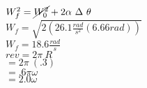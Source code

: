 \documentclass{article}
\begin{document}
        $W_f^2 = \cancel{W_0^2} +2\alpha~\Delta~\theta$ \\[10pt]
        $W_f = \sqrt{2(26.1\frac{rad}{s^2}(6.66rad))}$ \\[15pt]
        $W_f = 18.6 \frac{rad}{s}$ \\

        $rev = 2\pi~R$ \\ [15pt]
        $= 2\pi~(.3)$ \\ [10pt]
        $=.6\pi\omega$ \\[10pt]
        $=2.0\omega$ \\[10pt]
            
\end{document}

